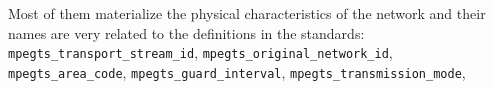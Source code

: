 \documentclass[
	12pt,				%
	openright,			%
	twoside,			%
	a4paper,			%
	brazil,
	french,				%
	english
	]{abntex2}
\begin{document}
Most of them materialize the physical characteristics of the network and their names are very related to the definitions in the standards: \texttt{mpegts\hspace{0.1mm}\hspace{0.1mm}\_\hspace{0.1mm}\hspace{0.1mm}transport\hspace{0.1mm}\hspace{0.1mm}\_\hspace{0.1mm}\hspace{0.1mm}stream\hspace{0.1mm}\hspace{0.1mm}\_\hspace{0.1mm}\hspace{0.1mm}id}, \texttt{mpegts\hspace{0.1mm}\hspace{0.1mm}\_\hspace{0.1mm}\hspace{0.1mm}original\hspace{0.1mm}\hspace{0.1mm}\_\hspace{0.1mm}\hspace{0.1mm}network\hspace{0.1mm}\hspace{0.1mm}\_\hspace{0.1mm}\hspace{0.1mm}id}, \texttt{mpegts\hspace{0.1mm}\hspace{0.1mm}\_\hspace{0.1mm}\hspace{0.1mm}area\hspace{0.1mm}\hspace{0.1mm}\_\hspace{0.1mm}\hspace{0.1mm}code}, \texttt{mpegts\hspace{0.1mm}\hspace{0.1mm}\_\hspace{0.1mm}\hspace{0.1mm}guard\hspace{0.1mm}\hspace{0.1mm}\_\hspace{0.1mm}\hspace{0.1mm}interval}, \texttt{mpegts\hspace{0.1mm}\hspace{0.1mm}\_\hspace{0.1mm}\hspace{0.1mm}transmission\hspace{0.1mm}\hspace{0.1mm}\_\hspace{0.1mm}\hspace{0.1mm}mode}, 
\end{document}
